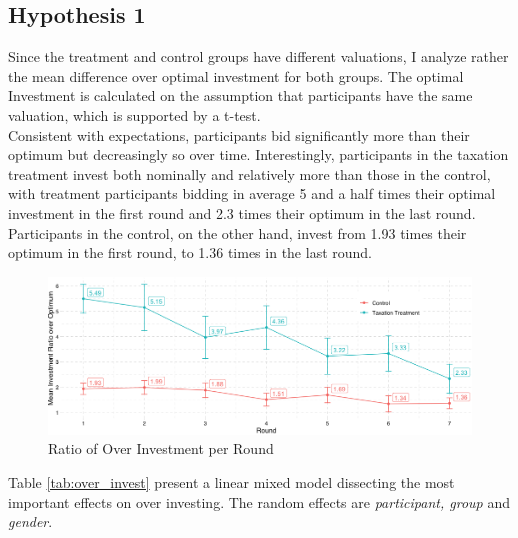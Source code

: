 \subsection{Hypothesis 1}

Since the treatment and control groups have different valuations, I analyze rather the mean difference over optimal investment for both groups. The optimal Investment is calculated on the assumption that participants have the same valuation, which is supported by a t-test.\\

Consistent with expectations, participants bid significantly more than their optimum but decreasingly so over time. Interestingly, participants in the taxation treatment invest both nominally and relatively more than those in the control, with treatment participants bidding in average 5 and a half times their optimal investment in the first round and 2.3 times their optimum in the last round. Participants in the control, on the other hand, invest from 1.93 times their optimum in the first round, to 1.36 times in the last round.\\


\begin{figure}[H]
    \centering
    \includegraphics[width=\textwidth]{graphs/over_invest.png}
    \caption{Ratio of Over Investment per Round}
    \label{fig:over_invest}
\end{figure}

Table \ref{tab:over_invest} present a linear mixed model dissecting the most important effects on over investing. The random effects are \textit{participant, group} and \textit{gender}.

